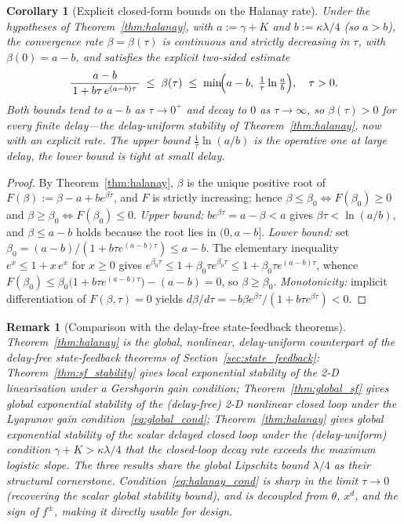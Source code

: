 \documentclass[12pt]{article}
\newtheorem{corollary}{Corollary}
\newtheorem{remark}{Remark}
\newcommand{\fpm}{f^{\pm}}
\begin{document}
\begin{corollary}[Explicit closed-form bounds on the Halanay rate]
\label{cor:halanay_rate}
Under the hypotheses of Theorem~\ref{thm:halanay}, with $a:=\gamma+K$ and
$b:=\kappa\lambda/4$ (so $a>b$), the convergence rate $\beta=\beta(\tau)$
is continuous and strictly decreasing in $\tau$, with $\beta(0)=a-b$, and
satisfies the explicit two-sided estimate
\begin{equation}
\frac{a-b}{\,1+b\tau\,e^{(a-b)\tau}\,}
\;\le\;\beta(\tau)\;\le\;
\min\!\Bigl(a-b,\;\tfrac{1}{\tau}\ln\tfrac{a}{b}\Bigr),
\quad \tau>0.
\label{eq:halanay_rate_bounds}
\end{equation}
Both bounds tend to $a-b$ as $\tau\to 0^{+}$ and decay to $0$ as
$\tau\to\infty$, so $\beta(\tau)>0$ for every finite delay---the
delay-uniform stability of Theorem~\ref{thm:halanay}, now with an
explicit rate. The upper bound $\tfrac{1}{\tau}\ln(a/b)$ is the
operative one at large delay, the lower bound is tight at small delay.
\end{corollary}

\begin{proof}
By Theorem~\ref{thm:halanay}, $\beta$ is the unique positive root of
$F(\beta):=\beta-a+be^{\beta\tau}$, and $F$ is strictly increasing; hence
$\beta\le\beta_{0}\Leftrightarrow F(\beta_{0})\ge 0$ and
$\beta\ge\beta_{0}\Leftrightarrow F(\beta_{0})\le 0$. \emph{Upper bound:}
$be^{\beta\tau}=a-\beta<a$ gives $\beta\tau<\ln(a/b)$, and $\beta\le a-b$
holds because the root lies in $(0,a-b]$. \emph{Lower bound:} set
$\beta_{0}=(a-b)/(1+b\tau e^{(a-b)\tau})\le a-b$. The elementary
inequality $e^{x}\le 1+x\,e^{x}$ for $x\ge 0$ gives
$e^{\beta_{0}\tau}\le 1+\beta_{0}\tau e^{\beta_{0}\tau}
\le 1+\beta_{0}\tau e^{(a-b)\tau}$, whence
$F(\beta_{0})\le\beta_{0}\bigl(1+b\tau e^{(a-b)\tau}\bigr)-(a-b)=0$, so
$\beta\ge\beta_{0}$. \emph{Monotonicity:} implicit differentiation of
$F(\beta,\tau)=0$ yields
$d\beta/d\tau=-b\beta e^{\beta\tau}/(1+b\tau e^{\beta\tau})<0$.
\end{proof}

\begin{remark}[Comparison with the delay-free state-feedback theorems]
\label{rem:halanay}
Theorem~\ref{thm:halanay} is the \emph{global, nonlinear, delay-uniform}
counterpart of the delay-free state-feedback theorems of
Section~\ref{sec:state_feedback}: Theorem~\ref{thm:sf_stability} gives
\emph{local} exponential stability of the 2-D linearisation under a
Gershgorin gain condition; Theorem~\ref{thm:global_sf} gives
\emph{global} exponential stability of the (delay-free) 2-D nonlinear
closed loop under the Lyapunov gain condition~\eqref{eq:global_cond};
Theorem~\ref{thm:halanay} gives \emph{global} exponential stability of
the \emph{scalar delayed} closed loop under the (delay-uniform)
condition $\gamma+K>\kappa\lambda/4$ that the closed-loop decay rate
exceeds the maximum logistic slope. The three results share the global
Lipschitz bound $\lambda/4$ as their structural cornerstone.
Condition~\eqref{eq:halanay_cond} is sharp in the limit $\tau\to 0$
(recovering the scalar global stability bound), and is decoupled from
$\theta$, $x^{d}$, and the sign of $\fpm$, making it directly usable for
design.
\end{remark}
\end{document}
